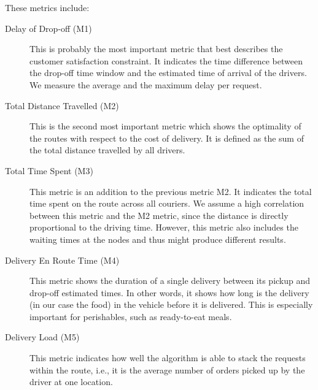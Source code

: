     These metrics include:
    \begin{description}
        \item[Delay of Drop-off (M1)] This is probably the most important metric that best describes the customer satisfaction constraint. It indicates the time difference between the drop-off time window and the estimated time of arrival of the drivers. We measure the average and the maximum delay per request. 
        
        \item[Total Distance Travelled (M2)] This is the second most important metric which shows the optimality of the routes with respect to the cost of delivery. It is defined as the sum of the total distance travelled by all drivers.
        
        \item[Total Time Spent (M3)] This metric is an addition to the previous metric M2. It indicates the total time spent on the route across all couriers. We assume a high correlation between this metric and the M2 metric, since the distance is directly proportional to the driving time. However, this metric also includes the waiting times at the nodes and thus might produce different results.
                

        
        \item[Delivery En Route Time (M4)] This metric shows the duration of a single delivery between its pickup and drop-off estimated times. In other words, it shows how long is the delivery (in our case the food) in the vehicle before it is delivered. This is especially important for perishables, such as ready-to-eat meals.
        
        \item[Delivery Load (M5)] This metric indicates how well the algorithm is able to stack the requests within the route, i.e., it is the average number of orders picked up by the driver at one location.
        
    \end{description}


